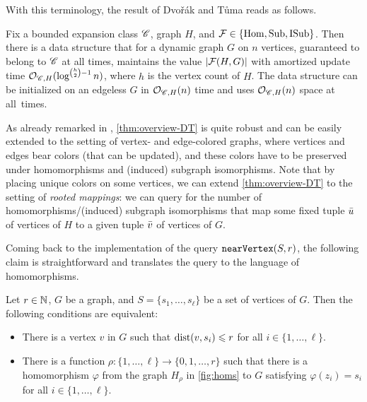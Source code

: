 With this terminology, the result of Dvo\v{r}\'ak and T\r{u}ma reads as follows.

\begin{theorem}\label{thm:overview-DT}
	Fix a bounded expansion class $\mathscr C$, graph $H$, and $\mathcal{F}\in \{\mathrm{Hom},\mathrm{Sub},\mathrm{ISub}\}$. Then there is a data structure that for a dynamic graph $G$ on $n$ vertices, guaranteed to belong to $\mathscr C$ at all times, maintains the value $|\mathcal{F}(H,G)|$ with amortized update time $\mathcal{O}_{\mathscr C,H}(\log^{\binom{h}{2}-1} n)$, where $h$ is the vertex count of $H$. The data structure can be initialized on an edgeless $G$ in $\mathcal{O}_{\mathscr C,H}(n)$ time and uses $\mathcal{O}_{\mathscr C,H}(n)$ space at all~times.	
\end{theorem}

As already remarked in \cite{DvorakT13}, \cref{thm:overview-DT} is quite robust and can be easily extended to the setting of vertex- and edge-colored graphs, where vertices and edges bear colors (that can be updated), and these colors have to be preserved under homomorphisms and (induced) subgraph isomorphisms. Note that by placing unique colors on some vertices, we can extend \cref{thm:overview-DT} to the setting of \emph{rooted mappings}: we can query for the number of homomorphisms/(induced) subgraph isomorphisms that map some fixed tuple ${\bar{u}}$ of vertices of $H$ to a given tuple ${\bar{v}}$ of vertices of $G$.

Coming back to the implementation of the query $\mathtt{nearVertex}(S,r)$, the following claim is straightforward and translates the query to the language of homomorphisms.

\begin{claim}\label{cl:homs}
	Let $r\in \mathbb{N}$, $G$ be a graph, and $S=\{s_1,\ldots,s_\ell\}$ be a set of vertices of $G$. Then the following conditions are equivalent:
	\begin{itemize}
		\item There is a vertex $v$ in $G$ such that $\mathrm{dist}(v,s_i)\leqslant r$ for all $i\in \{1,\ldots,\ell\}$.
		\item There is a function $\rho\colon \{1,\ldots,\ell\}\to \{0,1,\ldots,r\}$ such that there is a homomorphism $\varphi$ from the graph $H_\rho$ in \cref{fig:homs} to $G$ satisfying $\varphi(z_i)=s_i$ for all $i\in \{1,\ldots,\ell\}$.
	\end{itemize}
\end{claim}

